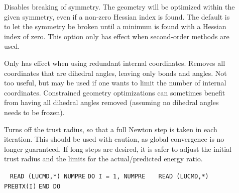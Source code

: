 \begin{description}
\item[]
Disables breaking of symmetry.
The geometry will be optimized within the given symmetry, even if a non-zero Hessian
index is found. The default is to let the symmetry be broken until
a minimum is found with a Hessian index of
zero. This option only has effect when second-order methods are used.

\item[]
Only has effect when using redundant internal coordinates. Removes all
coordinates that are dihedral angles, leaving only bonds and
angles. Not too useful, but may be used if one wants to limit the
number of internal coordinates. Constrained geometry optimizations can
sometimes benefit from having all dihedral angles removed (assuming no
dihedral angles needs to be frozen).

%

\item[]
Turns off the trust radius, so that a full Newton step
is taken in each iteration. This should be used with caution, as
global convergence is no longer guaranteed. If long steps are desired,
it is safer to adjust the initial trust radius and the limits for the
actual/predicted energy ratio.

\item[]\verb| |\newline
\verb|READ (LUCMD,*) NUMPRE|\newline
\verb|DO I = 1, NUMPRE|\newline
\verb|   READ (LUCMD,*) PREBTX(I)|\newline
\verb|END DO|


\end{description}
